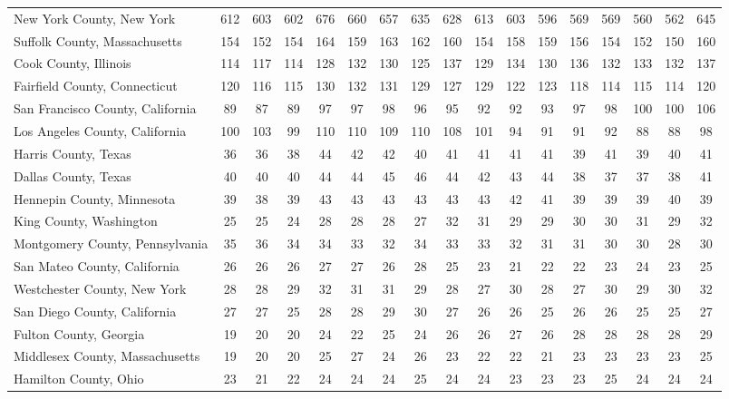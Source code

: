 \begin{landscape}
\begin{longtable}{lcccccccccccccccc}
New York County, New York & 612 & 603 & 602 & 676 & 660 & 657 & 635 & 628 & 613 & 603 & 596 & 569 & 569 & 560 & 562 & 645 \\
Suffolk County, Massachusetts & 154 & 152 & 154 & 164 & 159 & 163 & 162 & 160 & 154 & 158 & 159 & 156 & 154 & 152 & 150 & 160 \\
Cook County, Illinois & 114 & 117 & 114 & 128 & 132 & 130 & 125 & 137 & 129 & 134 & 130 & 136 & 132 & 133 & 132 & 137 \\
Fairfield County, Connecticut & 120 & 116 & 115 & 130 & 132 & 131 & 129 & 127 & 129 & 122 & 123 & 118 & 114 & 115 & 114 & 120 \\
San Francisco County, California & 89 & 87 & 89 & 97 & 97 & 98 & 96 & 95 & 92 & 92 & 93 & 97 & 98 & 100 & 100 & 106 \\
Los Angeles County, California & 100 & 103 & 99 & 110 & 110 & 109 & 110 & 108 & 101 & 94 & 91 & 91 & 92 & 88 & 88 & 98 \\
Harris County, Texas & 36 & 36 & 38 & 44 & 42 & 42 & 40 & 41 & 41 & 41 & 41 & 39 & 41 & 39 & 40 & 41 \\
Dallas County, Texas & 40 & 40 & 40 & 44 & 44 & 45 & 46 & 44 & 42 & 43 & 44 & 38 & 37 & 37 & 38 & 41 \\
Hennepin County, Minnesota & 39 & 38 & 39 & 43 & 43 & 43 & 43 & 43 & 43 & 42 & 41 & 39 & 39 & 39 & 40 & 39 \\
King County, Washington & 25 & 25 & 24 & 28 & 28 & 28 & 27 & 32 & 31 & 29 & 29 & 30 & 30 & 31 & 29 & 32 \\
Montgomery County, Pennsylvania & 35 & 36 & 34 & 34 & 33 & 32 & 34 & 33 & 33 & 32 & 31 & 31 & 30 & 30 & 28 & 30 \\
San Mateo County, California & 26 & 26 & 26 & 27 & 27 & 26 & 28 & 25 & 23 & 21 & 22 & 22 & 23 & 24 & 23 & 25 \\
Westchester County, New York & 28 & 28 & 29 & 32 & 31 & 31 & 29 & 28 & 27 & 30 & 28 & 27 & 30 & 29 & 30 & 32 \\
San Diego County, California & 27 & 27 & 25 & 28 & 28 & 29 & 30 & 27 & 26 & 26 & 25 & 26 & 26 & 25 & 25 & 27 \\
Fulton County, Georgia & 19 & 20 & 20 & 24 & 22 & 25 & 24 & 26 & 26 & 27 & 26 & 28 & 28 & 28 & 28 & 29 \\
Middlesex County, Massachusetts & 19 & 20 & 20 & 25 & 27 & 24 & 26 & 23 & 22 & 22 & 21 & 23 & 23 & 23 & 23 & 25 \\
Hamilton County, Ohio & 23 & 21 & 22 & 24 & 24 & 24 & 25 & 24 & 24 & 23 & 23 & 23 & 25 & 24 & 24 & 24 \\

\end{longtable}
\end{landscape}
